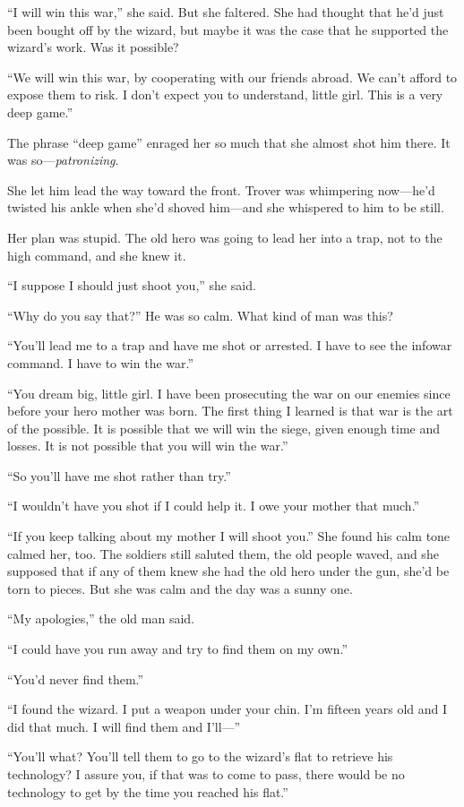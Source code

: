 “I will win this war,” she said. But she faltered. She had thought
that he’d just been bought off by the wizard, but maybe it was the
case that he supported the wizard’s work. Was it possible?

“We will win this war, by cooperating with our friends abroad. We
can’t afford to expose them to risk. I don’t expect you to
understand, little girl. This is a very deep game.”

The phrase “deep game” enraged her so much that she almost shot him
there. It was so—\emph{patronizing}.

She let him lead the way toward the front. Trover was whimpering
now—he’d twisted his ankle when she’d shoved him—and she whispered
to him to be still.

Her plan was stupid. The old hero was going to lead her into a
trap, not to the high command, and she knew it.

“I suppose I should just shoot you,” she said.

“Why do you say that?” He was so calm. What kind of man was this?

“You’ll lead me to a trap and have me shot or arrested. I have to
see the infowar command. I have to win the war.”

“You dream big, little girl. I have been prosecuting the war on our
enemies since before your hero mother was born. The first thing I
learned is that war is the art of the possible. It is possible that
we will win the siege, given enough time and losses. It is not
possible that you will win the war.”

“So you’ll have me shot rather than try.”

“I wouldn’t have you shot if I could help it. I owe your mother
that much.”

“If you keep talking about my mother I will shoot you.” She found
his calm tone calmed her, too. The soldiers still saluted them, the
old people waved, and she supposed that if any of them knew she had
the old hero under the gun, she’d be torn to pieces. But she was
calm and the day was a sunny one.

“My apologies,” the old man said.

“I could have you run away and try to find them on my own.”

“You’d never find them.”

“I found the wizard. I put a weapon under your chin. I’m fifteen
years old and I did that much. I will find them and I’ll—”

“You’ll what? You’ll tell them to go to the wizard’s flat to
retrieve his technology? I assure you, if that was to come to pass,
there would be no technology to get by the time you reached his
flat.”

